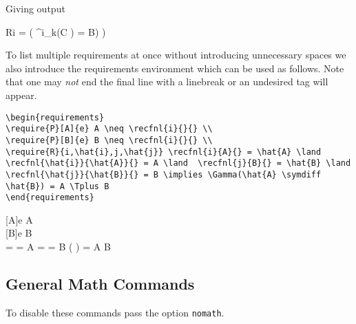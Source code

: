 \documentclass[leqno,11pt]{amsart}
\begin{document}
 Giving output 

\begin{require}{R}{i}
	 =  \implies   \exists[k] \left( \Upsilon^{i}_k(C \Tplus {}) = B) \lor {} \Tleq \Tzero \right)
\end{require}

To list multiple requirements at once without introducing unnecessary spaces we also introduce the requirements environment which can be used as follows.  Note that one may \textit{not} end the final line with a linebreak or an undesired tag will appear.

\begin{lstlisting}[breaklines]
\begin{requirements}
\require{P}[A]{e} A \neq \recfnl{i}{}{} \\
\require{P}[B]{e} B \neq \recfnl{i}{}{} \\
\require{R}{i,\hat{i},j,\hat{j}} \recfnl{i}{A}{} = \hat{A} \land \recfnl{\hat{i}}{\hat{A}}{} = A \land  \recfnl{j}{B}{} = \hat{B} \land \recfnl{\hat{j}}{\hat{B}}{} = B \implies \Gamma(\hat{A} \symdiff \hat{B}) = A \Tplus B 
\end{requirements}
\end{lstlisting}

\begin{requirements}
[A]{e} A \neq {} \\
[B]{e} B \neq {} \\
  =  \land {} = A \land  {} =  \land {} = B \implies \Gamma( \symdiff {}) = A \Tplus B 
\end{requirements}




\subsection{General Math Commands}
To disable these commands pass the option \verb=nomath=. \\
\end{document}
